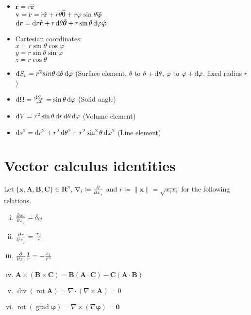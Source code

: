 \documentclass[a4paper, 11pt]{scrartcl}
\renewcommand{\vec}[1]{\bm{#1}}
\newcommand{\uvec}[1]{\hat{\vec{#1}}}
\begin{document}
\begin{itemize}
  \item $\vec{r} = r \hat{\vec{r}}$\\
        $\vec{v} = \dot{\vec{r}} = \dot{r} \hat{\vec{r}} + r \dot{\theta} \uvec{\theta} + r \dot{\varphi} \sin\theta \uvec{\varphi}$\\
        $\dif \vec{r} = \dif r \uvec{r} + r \dif \theta \uvec{\theta} + r \sin \theta \dif \varphi \uvec{\varphi}$
  \item Cartesian coordinates:\\
        $x = r \sin\theta \cos\varphi$\\
        $y = r \sin\theta \sin\varphi$\\
        $z = r \cos\theta$
  \item $\dif S_r = r^2 sin\theta \dif \theta \dif \varphi$ \quad (Surface element, $\theta$ to $\theta + \dif \theta$, $\varphi$ to $\varphi + \dif \varphi$, fixed radius $r$)
  \item $\dif \Omega = \frac{\dif S_r}{r^2} = \sin\theta \dif \varphi$ \quad (Solid angle)
  \item $\dif V = r^2 \sin\theta \dif r \dif \theta \dif \varphi$ \quad (Volume element)
  \item $\dif s^2 = \dif r^2 + r^2 \dif \theta^2 + r^2 \sin^2 \theta \dif \varphi^2$ (Line element)
\end{itemize}

\section*{Vector calculus identities}

Let $\{\vec{x}, \vec{A}, \vec{B}, \vec{C}\} \in \mathbf{R}^n$, $\nabla_i \coloneqq \pd{}{x_i}$ and $r \coloneqq \|\vec{x}\| = \sqrt{x_i x_i}$ for the following relations.
\begin{enumerate}[(i)]
  \item $\pd{x_i}{x_j}=\delta_{ij}$
  \item $\pd{r}{x_j}=\frac{x_j}{r}$
  \item $\pd{}{x_j}\frac{1}{r}=-\frac{x_j}{r^3}$
  \item $\vec{A}\times(\vec{B}\times\vec{C}) = \vec{B}(\vec{A}\cdot\vec{C})-\vec{C}(\vec{A}\cdot\vec{B})$
  \item $\operatorname{div}(\operatorname{rot}\vec{A}) =
  \nabla\cdot(\nabla\times\vec{A}) = 0\label{eq:divrot}$
  \item $\operatorname{rot}(\operatorname{grad}\vec{\varphi}) =
  \nabla\times(\nabla\vec{\varphi}) = \vec{0}\label{eq:rotgrad}$
\end{enumerate}
\end{document}
